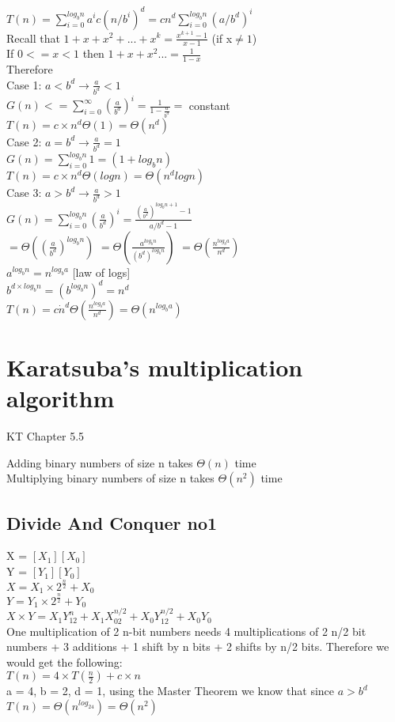 \documentclass{article}
\begin{document}
$T(n) = \sum_{i=0}^{log_bn}a^ic(n/b^i)^d = cn^d\sum_{i=0}^{log_bn}(a/b^d)^i$\\
Recall that $1+x+x^2+...+x^k = \frac{x^{k+1} - 1}{x-1}$ (if x$\ne 1$)\\
If $0 <= x < 1$ then $1+x+x^2... = \frac{1}{1-x}$\\

Therefore\\
Case 1: $a<b^d \to \frac{a}{b^d} < 1$\\
$G(n) <= \sum_{i=0}^{\infty}(\frac{a}{b^d})^i = \frac{1}{1-\frac{a}{b^d}} =$ constant\\
$T(n) = c \times n ^ d \Theta(1) = \Theta(n^d)$\\

Case 2: $a=b^d \to \frac{a}{b^d} = 1$\\
$G(n) = \sum_{i=0}^{log_bn}1 = (1 + log_bn)$\\
$T(n) = c \times n ^ d \Theta(logn) = \Theta(n^dlogn)$\\

Case 3: $a > b^d \to \frac{a}{b^d} > 1$\\
$G(n) = \sum_{i=0}^{log_bn}(\frac{a}{b^d})^i = \frac{(\frac{a}{b^d})^{log_bn+1} - 1}{a/b^d - 1}$\\
$= \Theta((\frac{a}{b^d})^{log_bn})$
$= \Theta(\frac{a^{log_bn}}{(b^d)^{log_bn}})$
$= \Theta(\frac{n^{log_ba}}{n^d})$\\

$a^{log_bn} = n^{log_ba}$ [law of logs]\\
$b^{d\times log_bn} = (b^{log_bn})^d = n^d$\\
$T(n) = c \dot n^d\Theta(\frac{n^{log_ba}}{n^d}) = \Theta(n^{log_ba})$

\section{Karatsuba's multiplication algorithm}
KT Chapter 5.5

Adding binary numbers of size n takes $\Theta(n)$ time\\
Multiplying binary numbers of size n takes $\Theta(n^2)$ time\\

\subsection{Divide And Conquer no1}
X = $[X_1][X_0]$\\
Y = $[Y_1][Y_0]$\\
$X = X_1 \times 2^{\frac{n}{2}} + X_0$\\
$Y = Y_1 \times 2^{\frac{n}{2}} + Y_0$\\
$X \times Y = X_1Y_12^n + X_1X_02^{n/2} + X_0Y_12^{n/2}+X_0Y_0$\\
One multiplication of 2 n-bit numbers needs 4 multiplications of 2 n/2 bit numbers + 3 additions + 1 shift by n bits + 2 shifts by n/2 bits. Therefore we would get the following:\\
$T(n) = 4\times T(\frac{n}{2}) + c \times n$\\
a = 4, b = 2, d = 1, using the Master Theorem we know that since $a > b^d$\\
$T(n) = \Theta(n^{log_24}) = \Theta(n^2)$
\end{document}
